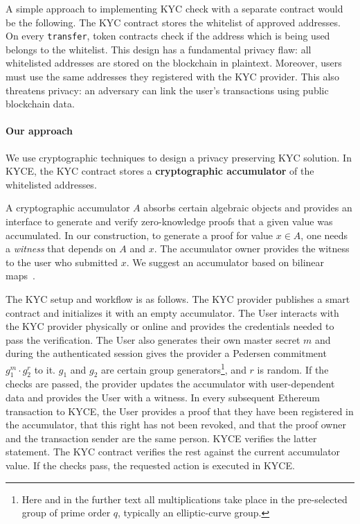 A simple approach to implementing KYC check with a separate contract would be the following.
The KYC contract stores the whitelist of approved addresses.
On every \texttt{transfer}, token contracts check if the address which is being used belongs to the whitelist.
This design has a fundamental privacy flaw: all whitelisted addresses are stored on the blockchain in plaintext.
Moreover, users must use the same addresses they registered with the KYC provider.
This also threatens privacy: an adversary can link the user's transactions using public blockchain data.

\paragraph{Our approach}
We use cryptographic techniques to design a privacy preserving KYC solution.
In KYCE, the KYC contract stores a \textbf{cryptographic accumulator} of the whitelisted addresses. 

A cryptographic accumulator $A$ absorbs certain algebraic objects and provides an interface to generate and verify zero-knowledge proofs that a given value was accumulated.
In our construction, to generate a proof for value $x\in A$, one needs a \textit{witness} that depends on $A$ and $x$.
The accumulator owner provides the witness to the user who submitted $x$.
We suggest an accumulator based on bilinear maps~\cite{Camenisch2009}.

The KYC setup and workflow is as follows.
The KYC provider publishes a smart contract and initializes it with an empty accumulator.
The User interacts with the KYC provider physically or online and provides the credentials needed to pass the verification.
The User also generates their own master secret $m$ and during the authenticated session gives the provider a Pedersen commitment $g_1^m\cdot g_2^r$ to it.
$g_1$ and $g_2$ are certain group generators\footnote{Here and in the further text all multiplications take place in the pre-selected group of prime order $q$, typically an elliptic-curve group.}, and $r$ is random.
If the checks are passed, the provider updates the accumulator with user-dependent data and provides the User with a witness.
In every subsequent Ethereum transaction to KYCE, the User provides a proof that they have been registered in the accumulator, that this right has not been revoked, and that the proof owner and the transaction sender are the same person.
KYCE verifies the latter statement.
The KYC contract verifies the rest against the current accumulator value.
If the checks pass, the requested action is executed in KYCE.

